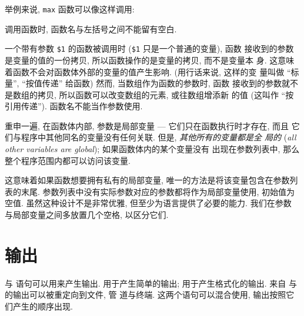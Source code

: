 举例来说, \verb'max' 函数可以像这样调用:
调用函数时, 函数名与左括号之间不能留有空白.

一个带有参数 \verb'$1' 的函数被调用时 (\verb'$1' 只是一个普通的变量), 函数
接收到的参数是变量的值的一份拷贝, 所以函数操作的是变量的拷贝, 而不是变量本
身. 这意味着函数不会对函数体外部的变量的值产生影响. (用行话来说, 这样的变
量叫做 ``标量'', ``按值传递'' 给函数) 然而, 当数组作为函数的参数时, 函数
接收到的参数就不是数组的拷贝, 所以函数可以改变数组的元素, 或往数组增添新
的值 (这叫作 ``按引用传递''). 函数名不能当作参数使用.

重申一遍, 在函数体内部, 参数是局部变量 --- 它们只在函数执行时才存在, 而且
它们与程序中其他同名的变量没有任何关联. 但是, \emph{其他所有的变量都是全
局的} (\emph{all other variables are global}); 如果函数体内的某个变量没有
出现在参数列表中, 那么整个程序范围内都可以访问该变量.

这意味着如果函数想要拥有私有的局部变量, 唯一的方法是将该变量包含在参数列
表的末尾. 参数列表中没有实际参数对应的参数都将作为局部变量使用, 初始值为
空值. 虽然这种设计不是非常优雅, 但至少为语言提供了必要的能力. 我们在参数
与局部变量之间多放置几个空格, 以区分它们.

\section{输出}
\label{sec:output}

\print 与 \printf 语句可以用来产生输出. \print 用于产生简单的输出; \printf
用于产生格式化的输出. 来自 \print 与 \printf 的输出可以被重定向到文件, 管
道与终端. 这两个语句可以混合使用, 输出按照它们产生的顺序出现.

